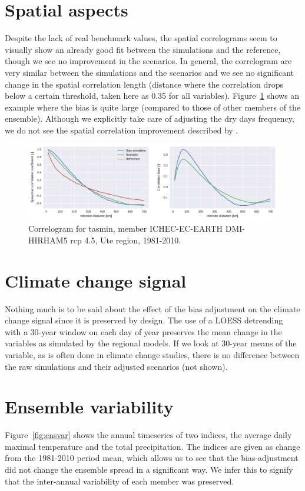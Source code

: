 \documentclass[letterpaper,10pt]{article}
\begin{document}
\section{Spatial aspects}
Despite the lack of real benchmark values, the spatial correlograms seem to visually show an already good fit between the simulations and the reference, though we see no improvement in the scenarios.
In general, the correlogram are very similar between the simulations and the scenarios and we see no significant change in the spatial correlation length (distance where the correlation drops below a certain threshold, taken here as 0.35 for all variables).
Figure~\ref{fig:scorr} shows an example where the bias is quite large (compared to those of other members of the ensemble).
Although we explicitly take care of adjusting the dry days frequency, we do not see the spatial correlation improvement described by \cite{Francois2020}.

\begin{figure}
\centering
\includegraphics[width=\textwidth]{../images/correlogram_tasmin_diags.pdf}
\caption{Correlogram for tasmin, member ICHEC-EC-EARTH DMI-HIRHAM5 rcp 4.5, Ute region, 1981-2010.}\label{fig:scorr}
\end{figure}

\section{Climate change signal}
Nothing much is to be said about the effect of the bias adjustment on the climate change signal since it is preserved by design.
The use of a LOESS detrending with a 30-year window on each day of year preserves the mean change in the variables as simulated by the regional models.
If we look at 30-year means of the variable, as is often done in climate change studies, there is no difference between the raw simulations and their adjusted scenarios (not shown).

\section{Ensemble variability}
Figure~\ref{fig:ensvar} shows the annual timeseries of two indices, the average daily maximal temperature and the total precipitation.
The indices are given as change from the 1981-2010 period mean, which allows us to see that the bias-adjustment did not change the ensemble spread in a significant way.
We infer this to signify that the inter-annual variability of each member was preserved.
\end{document}
